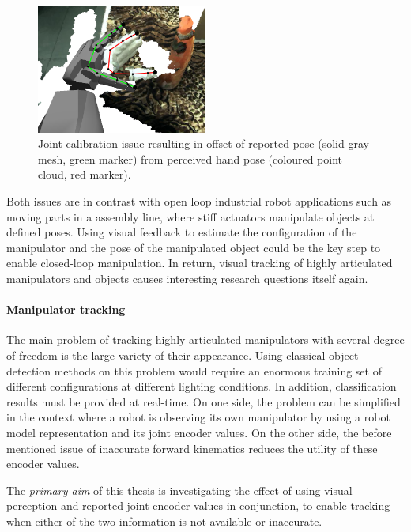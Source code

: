 \begin{figure}
\captionsetup{width=0.6\textwidth}
\centering
\includegraphics[width=0.5\textwidth]{images/valkyrie/joint_calibration_issue.png}
\caption{Joint calibration issue resulting in offset of reported pose (solid gray mesh, green marker) from perceived hand pose (coloured point cloud, red marker).}
\label{fig:calibration_issue}
\end{figure}

Both issues are in contrast with open loop industrial robot applications such as moving parts in a assembly line, where stiff actuators manipulate objects at defined poses. Using visual feedback to estimate the configuration of the manipulator and the pose of the manipulated object could be the key step to enable closed-loop manipulation.
In return, visual tracking of highly articulated manipulators and objects causes interesting research questions itself again.

\paragraph{Manipulator tracking}
The main problem of tracking highly articulated manipulators with several degree of freedom is the large variety of their appearance. Using classical object detection methods on this problem would require an enormous training set of different configurations at different lighting conditions. In addition, classification results must be provided at real-time. On one side, the problem can be simplified in the context where a robot is observing its own manipulator by using a robot model representation and its joint encoder values. On the other side, the before mentioned issue of inaccurate forward kinematics reduces the utility of these encoder values.

The \emph{primary aim} of this thesis is investigating the effect of using visual perception and reported joint encoder values in conjunction, to enable tracking when either of the two information is not available or inaccurate.

